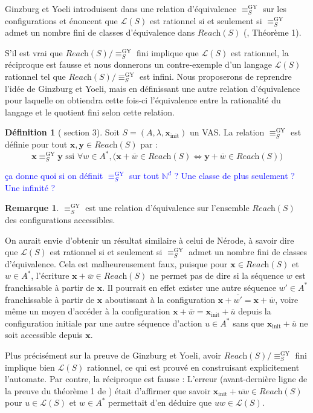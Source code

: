 \documentclass[a4paper,final]{article}
\theoremstyle{definition}
\newtheorem{Definition}[Theorem]{Définition}
\newtheorem*{Remark}{Remarque}
\newcommand{\alain}[1]{\textcolor{blue}{#1}}
\newcommand{\N}{\ensuremath{\mathbb{N}}}
\newcommand{\lang}{\ensuremath{\mathcal{L}}}
\newcommand{\reach}{\ensuremath{\textit{Reach}}}
\newcommand{\vect}[1]{\ensuremath{\mathbf{#1}}}
\newcommand{\relGY}{\ensuremath{\equiv^\text{GY}_S}}
\newcommand{\ssi}{\ensuremath{\text{ ssi }}}
\newcommand{\equivaut}{\ensuremath{\Leftrightarrow}}
\newcommand{\xinit}{\ensuremath{\vect{x}_\text{init}}}
\newcommand{\valeur}[1]{\ensuremath{\overline{#1}}}
\begin{document}
Ginzburg et Yoeli introduisent dans \cite{giyo80} une relation d'équivalence $\relGY$ sur les configurations et énoncent que $\lang(S)$ est rationnel si et seulement si $\relGY$ admet un nombre fini de classes d'équivalence dans $\reach(S)$ (\cite{giyo80}, Théorème 1).

S'il est vrai que $\reach(S)/\relGY$ fini implique que $\lang(S)$ est rationnel, la réciproque est fausse et nous donnerons un contre-exemple d'un langage $\lang(S)$ rationnel tel que $\reach(S)/\relGY$ est infini. 
Nous proposerons de reprendre l'idée de Ginzburg et Yoeli,
mais en définissant une autre relation d'équivalence pour laquelle on obtiendra cette fois-ci l'équivalence entre la rationalité du langage et le quotient fini selon cette relation.

\begin{Definition}[\cite{giyo80} section 3]
Soit $S=(A,\lambda,\xinit)$ un VAS. La relation $\relGY$ est définie pour tout $\vect{x},\vect{y} \in\reach(S)$ par : 
$$\vect{x}\relGY\vect{y} \ssi \forall w\in A^\ast, \big( \vect{x} +\valeur{w}\in\reach(S) \equivaut \vect{y} +\valeur{w}\in\reach(S) \big)$$
\end{Definition}
\alain{ça donne quoi si on définit $\relGY$ sur tout $\N^d$ ? Une classe de plus seulement ? Une infinité ?}

\begin{Remark}
$\relGY$ est une relation d'équivalence sur l'ensemble $\reach(S)$ des configurations accessibles.
\end{Remark}

On aurait envie d'obtenir un résultat similaire à celui de Nérode, à savoir dire que $\lang(S)$ est rationnel si et seulement si $\relGY$ admet un nombre fini de classes d'équivalence.
Cela est malheureusement faux, puisque pour $\vect{x}\in\reach(S)$ et $w\in A^\ast$, l'écriture $\vect{x} +\valeur{w}\in\reach(S)$ ne permet pas de dire si la séquence $w$ est franchissable à partir de $\vect{x}$.
Il pourrait en effet exister une autre séquence $w'\in A^\ast$ franchissable à partir de $\vect{x}$ aboutissant à la configuration $\vect{x} +\valeur{w'} = \vect{x} +\valeur{w}$,
voire même un moyen d'accéder à la configuration $\vect{x} +\valeur{w} = \xinit +\valeur{u}$ depuis la configuration initiale par une autre séquence d'action $u\in A^\ast$ sans que $\xinit +\valeur{u}$ ne soit accessible depuis $\vect{x}$.

Plus précisément sur la preuve de Ginzburg et Yoeli, 
avoir $\reach(S)/\relGY$ fini implique bien $\lang(S)$ rationnel, ce qui est prouvé en construisant explicitement l'automate.
Par contre, la réciproque est fausse : 
L'erreur (avant-dernière ligne de la preuve du théorème 1 de \cite{giyo80}) était d'affirmer que savoir $\xinit +\valeur{uw}\in\reach(S)$ pour $u\in\lang(S)$ et $w\in A^\ast$ permettait d'en déduire que $uw\in\lang(S)$.
\end{document}
